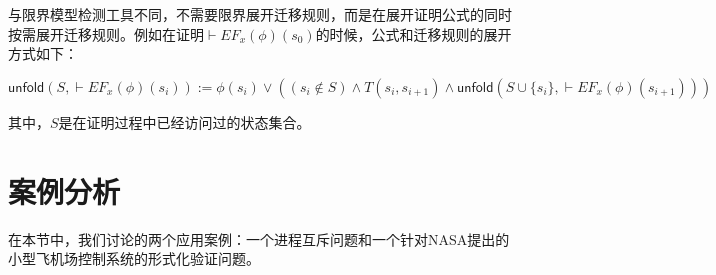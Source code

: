 与限界模型检测工具不同，\sctlprov{}不需要限界展开迁移规则，而是在展开证明公式的同时按需展开迁移规则。例如在证明$\vdash EF_x(\phi)(s_0)$的时候，公式和迁移规则的展开方式如下：

\begin{center}{\small
		$
		\textsf{unfold}(S,\vdash EF_x(\phi)(s_i)) := 
		\phi(s_i) \vee ((s_i\notin S) \wedge T(s_i, s_{i+1}) \wedge 
		\textsf{unfold}(S\cup \{s_i\},\vdash EF_x(\phi)(s_{i+1})))
		$
	}
\end{center}
其中，$S$是在证明过程中已经访问过的状态集合。




\section{案例分析}\label{sec:case_exp}

在本节中，我们讨论\sctlprov{}的两个应用案例：一个进程互斥问题和一个针对NASA提出的小型飞机场控制系统的形式化验证问题。


